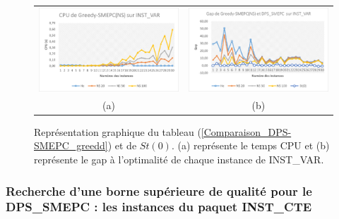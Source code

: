 \begin{figure}[H]
	\centering
	\begin{tabular}{c c}
		\includegraphics[width=9cm]{images_these/CPU_NS_INST_VAR.pdf}&
		\includegraphics[width=9cm]{images_these/Gap_NS_INST_VAR.pdf}
		\\
		(a) & (b)
	\end{tabular}
	\caption[Représentation graphique du CPU et du gap du tableau (\ref{Comparaison_DPS-SMEPC_greedd})]{Représentation graphique du tableau (\ref{Comparaison_DPS-SMEPC_greedd}) et de $St(0)$. (a) représente le temps CPU et (b) représente le gap à l'optimalité de chaque instance de INST\_VAR.}\label{gap_cpu_NS_INST_VAR}
\end{figure}

\subsubsection{Recherche d'une borne supérieure de qualité pour le DPS\_SMEPC : les instances du paquet INST\_CTE}
 

